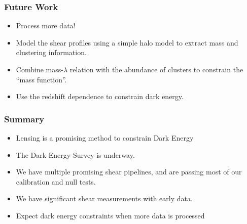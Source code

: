 \documentclass{beamer}
\begin{document}
\frame
{
    \frametitle{Future Work}

    \begin{itemize}

        \item Process more data!

        \item Model the shear profiles using a simple halo model to extract
            mass and clustering information.

        \item Combine mass-$\lambda$ relation with the abundance of clusters to
            constrain the ``mass function''.

        \item Use the redshift dependence to constrain dark energy.

    \end{itemize}

}

\frame
{
    \frametitle{Summary}

    \begin{itemize}

        \item Lensing is a promising method to constrain Dark Energy

        \item The Dark Energy Survey is underway.

        \item We have multiple promising shear pipelines, and are passing most
            of our calibration and null tests.

        \item We have significant shear measurements with early data.

        \item Expect dark energy constraints when more data is processed

    \end{itemize}

}
\end{document}
